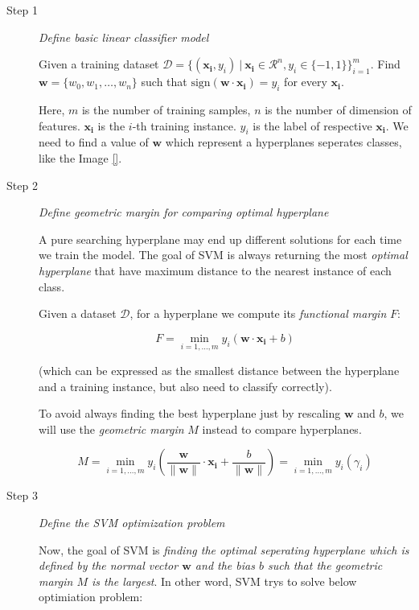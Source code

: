 \begin{description}

	\item[Step 1] \emph{Define basic linear classifier model}
	
	Given a training dataset $\mathcal{D} = \{ (\bm{x_i}, y_i) \ \vert \ \bm{x_i} \in \mathcal{R}^n, y_i \in \{ -1, 1 \} \}_{i = 1}^{m}$. Find $\bm{w} = \{ w_0, w_1, \ldots, w_n\}$ such that $\text{sign}(\bm{w} \cdot \bm{x_i}) = y_i$ for every $\bm{x_i}$. 
	
	Here, $m$ is the number of training samples, $n$ is the number of dimension of features. $\bm{x_i}$  is the $i$-th training instance. $y_i$ is the label of respective $\bm{x_i}$. We need to find a value of $\bm{w}$ which represent a hyperplanes seperates classes, like the Image \ref{}.
	
	\item[Step 2] \emph{Define geometric margin for comparing optimal hyperplane}
	
	A pure searching hyperplane may end up different solutions for each time we train the model. The goal of SVM is always returning the most \emph{optimal hyperplane } that have maximum distance to the nearest instance of each class.
	
	Given a dataset $\mathcal{D}$, for a hyperplane we compute its \emph{functional margin} $F$:
	
	\begin{equation*}
		F = \min_{i=1, \ldots, m} y_i( \bm{w} \cdot \bm{x_i} + b)
	\end{equation*}
	
	(which can be expressed as the smallest distance between the hyperplane and a training instance, but also need to classify correctly).
	
	To avoid always finding the best hyperplane just by rescaling $\bm{w}$ and $b$, we will use the \emph{geometric margin} $M$ instead to compare hyperplanes.
	
	\begin{equation*}
	\boxed{
		M = \min_{i = 1, \dots, m} y_i \left( \dfrac{\bm{w}}{\parallel\bm{w}\parallel} \cdot \bm{x_i} + \dfrac{b}{\parallel\bm{w}\parallel} \right) = \min_{i = 1, \ldots, m} y_i \left( \gamma_i \right)
	}
	\end{equation*}
	
	\item[Step 3] \emph{Define the SVM optimization problem}
	
	Now, the goal of SVM is \emph{finding the optimal seperating hyperplane which is defined by the normal vector $\bm{w}$ and the bias $b$ such that the geometric margin $M$ is the largest}. In other word, SVM trys to solve below optimiation problem:
	

\end{description}

